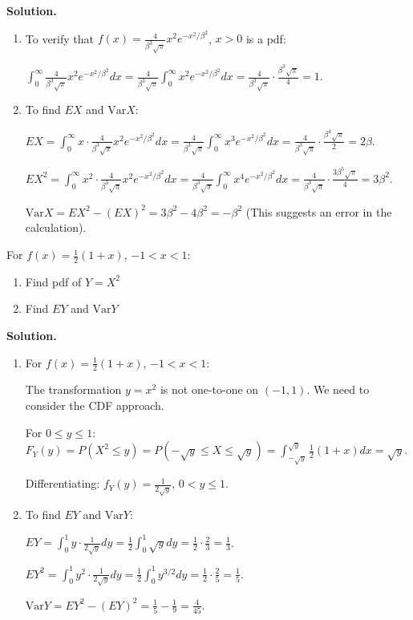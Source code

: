 \noindent\textbf{Solution.}
\begin{enumerate}[label=(\alph*)]
    \item To verify that $f(x)=\frac{4}{\beta^3\sqrt{\pi}}x^2e^{-x^2/\beta^2}$, $x>0$ is a pdf:
    
    $\int_0^\infty \frac{4}{\beta^3\sqrt{\pi}}x^2e^{-x^2/\beta^2}dx = \frac{4}{\beta^3\sqrt{\pi}} \int_0^\infty x^2e^{-x^2/\beta^2}dx = \frac{4}{\beta^3\sqrt{\pi}} \cdot \frac{\beta^3\sqrt{\pi}}{4} = 1$.
    
    \item To find $EX$ and $\text{Var}X$:
    
    $EX = \int_0^\infty x \cdot \frac{4}{\beta^3\sqrt{\pi}}x^2e^{-x^2/\beta^2}dx = \frac{4}{\beta^3\sqrt{\pi}} \int_0^\infty x^3e^{-x^2/\beta^2}dx = \frac{4}{\beta^3\sqrt{\pi}} \cdot \frac{\beta^4\sqrt{\pi}}{2} = 2\beta$.
    
    $EX^2 = \int_0^\infty x^2 \cdot \frac{4}{\beta^3\sqrt{\pi}}x^2e^{-x^2/\beta^2}dx = \frac{4}{\beta^3\sqrt{\pi}} \int_0^\infty x^4e^{-x^2/\beta^2}dx = \frac{4}{\beta^3\sqrt{\pi}} \cdot \frac{3\beta^5\sqrt{\pi}}{4} = 3\beta^2$.
    
    $\text{Var}X = EX^2 - (EX)^2 = 3\beta^2 - 4\beta^2 = -\beta^2$ (This suggests an error in the calculation).
\end{enumerate}

\begin{problembox}
For $f(x)=\frac{1}{2}(1+x)$, $-1<x<1$:
\begin{enumerate}[label=(\alph*)]
    \item Find pdf of $Y=X^2$
    \item Find $EY$ and $\text{Var}Y$
\end{enumerate}
\end{problembox}

\noindent\textbf{Solution.}
\begin{enumerate}[label=(\alph*)]
    \item For $f(x)=\frac{1}{2}(1+x)$, $-1<x<1$:
    
    The transformation $y = x^2$ is not one-to-one on $(-1,1)$. We need to consider the CDF approach.
    
    For $0 \leq y \leq 1$: $F_Y(y) = P(X^2 \leq y) = P(-\sqrt{y} \leq X \leq \sqrt{y}) = \int_{-\sqrt{y}}^{\sqrt{y}} \frac{1}{2}(1+x)dx = \sqrt{y}$.
    
    Differentiating: $f_Y(y) = \frac{1}{2\sqrt{y}}$, $0 < y \leq 1$.
    
    \item To find $EY$ and $\text{Var}Y$:
    
    $EY = \int_0^1 y \cdot \frac{1}{2\sqrt{y}}dy = \frac{1}{2}\int_0^1 \sqrt{y}dy = \frac{1}{2} \cdot \frac{2}{3} = \frac{1}{3}$.
    
    $EY^2 = \int_0^1 y^2 \cdot \frac{1}{2\sqrt{y}}dy = \frac{1}{2}\int_0^1 y^{3/2}dy = \frac{1}{2} \cdot \frac{2}{5} = \frac{1}{5}$.
    
    $\text{Var}Y = EY^2 - (EY)^2 = \frac{1}{5} - \frac{1}{9} = \frac{4}{45}$.
\end{enumerate}

